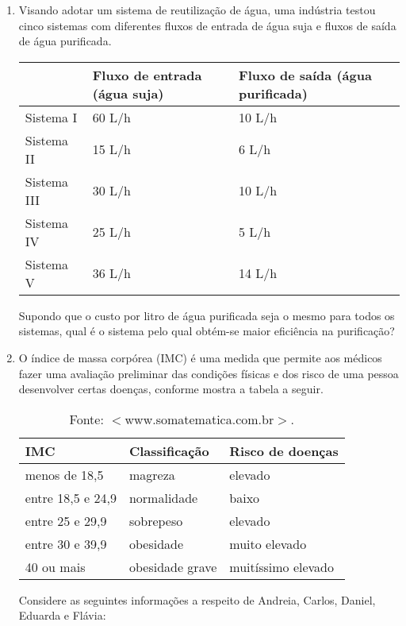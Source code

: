 \documentclass[a4paper,14pt]{article}
\begin{document}
\begin{multicols}{2}
\begin{enumerate}
			\item Visando adotar um sistema de reutilização de água, uma indústria testou cinco sistemas com diferentes fluxos de entrada de água suja e fluxos de saída de água purificada.
			\begin{table}[H]
				\begin{tabular}{|p{2.4cm}|p{2.4cm}|p{2.4cm}|}
					\hline
					\textbf{~} & \textbf{Fluxo de entrada (água suja)} & \textbf{Fluxo de saída (água purificada)} \\ \hline
					Sistema I   & 60 L/h   & 10 L/h   \\ \hline
					Sistema II   & 15 L/h   & 6 L/h   \\ \hline
					Sistema III   & 30 L/h   & 10 L/h   \\ \hline
					Sistema IV   & 25 L/h   & 5 L/h   \\ \hline
					Sistema V   & 36 L/h   & 14 L/h   \\ \hline
				\end{tabular}
			\end{table}
			Supondo que o custo por litro de água purificada seja o mesmo para todos os sistemas, qual é o sistema pelo qual obtém-se maior eficiência na purificação? \newpage
			\item O índice de massa corpórea (IMC) é uma medida que permite aos médicos fazer uma avaliação preliminar das condições físicas e dos risco de uma pessoa desenvolver certas doenças, conforme mostra a tabela a seguir.
			\begin{table}[H]
				\begin{tabular}{|p{1.8cm}|p{3cm}|p{2.4cm}|}
					\hline
					\textbf{IMC} & \textbf{Classificação} & \textbf{Risco de doenças} \\ \hline
					menos de 18,5   & magreza   & elevado   \\ \hline
					entre 18,5 e 24,9   & normalidade   & baixo   \\ \hline
					entre 25 e 29,9   & sobrepeso   & elevado   \\ \hline
					entre 30 e 39,9   & obesidade   & muito elevado   \\ \hline
					40 ou mais   & obesidade grave   & muitíssimo elevado   \\ \hline
				\end{tabular}
				\caption*{Fonte: $<$www.somatematica.com.br$>$.}
			\end{table}
			Considere as seguintes informações a respeito de Andreia, Carlos, Daniel, Eduarda e Flávia:
			\begin{table}[H]

\end{table}
\end{enumerate}
\end{multicols}
\end{document}
